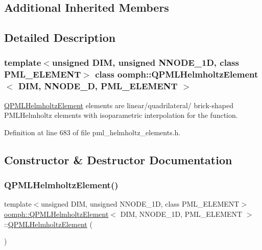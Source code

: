 \subsection*{Additional Inherited Members}


\subsection{Detailed Description}
\subsubsection*{template$<$unsigned D\+IM, unsigned N\+N\+O\+D\+E\+\_\+1D, class P\+M\+L\+\_\+\+E\+L\+E\+M\+E\+NT$>$\newline
class oomph\+::\+Q\+P\+M\+L\+Helmholtz\+Element$<$ D\+I\+M, N\+N\+O\+D\+E\+\_\+D, P\+M\+L\+\_\+\+E\+L\+E\+M\+E\+N\+T $>$}

\hyperlink{classoomph_1_1QPMLHelmholtzElement}{Q\+P\+M\+L\+Helmholtz\+Element} elements are linear/quadrilateral/ brick-\/shaped P\+M\+L\+Helmholtz elements with isoparametric interpolation for the function. 

Definition at line 683 of file pml\+\_\+helmholtz\+\_\+elements.\+h.



\subsection{Constructor \& Destructor Documentation}
\mbox{\label{classoomph_1_1QPMLHelmholtzElement_ae9ae56db30749a87cb44c14585925a7b}} 
\subsubsection{\texorpdfstring{Q\+P\+M\+L\+Helmholtz\+Element()}{QPMLHelmholtzElement()}\hspace{0.1cm}{\footnotesize\ttfamily [1/2]}}
{\footnotesize\ttfamily template$<$unsigned D\+IM, unsigned N\+N\+O\+D\+E\+\_\+1D, class P\+M\+L\+\_\+\+E\+L\+E\+M\+E\+NT$>$ \\
\hyperlink{classoomph_1_1QPMLHelmholtzElement}{oomph\+::\+Q\+P\+M\+L\+Helmholtz\+Element}$<$ D\+IM, N\+N\+O\+D\+E\+\_\+1D, P\+M\+L\+\_\+\+E\+L\+E\+M\+E\+NT $>$\+::\hyperlink{classoomph_1_1QPMLHelmholtzElement}{Q\+P\+M\+L\+Helmholtz\+Element} (\begin{DoxyParamCaption}{ }\end{DoxyParamCaption})\hspace{0.3cm}{\ttfamily [inline]}}




